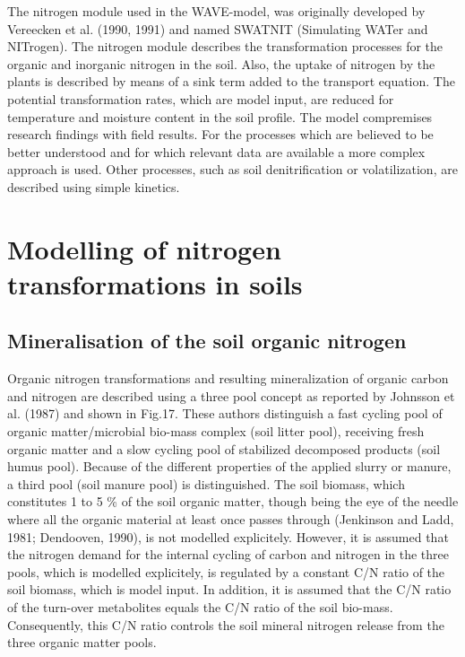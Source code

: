The nitrogen module used in the WAVE-model, was originally developed by Vereecken et al. (1990, 1991) and named SWATNIT (Simulating WATer and NITrogen). The nitrogen module describes the transformation processes for the organic and inorganic nitrogen in the soil. Also, the uptake of nitrogen by the plants is described by means of a sink term added to the transport equation. The potential transformation rates, which are model input, are reduced for temperature and moisture content in the soil profile. The model compremises research findings with field results. For the processes which are believed to be better understood and for which relevant data are available a more complex approach is used. Other processes, such as soil denitrification or volatilization, are described using simple kinetics.\\

\section{ Modelling of nitrogen transformations in soils}


\subsection {Mineralisation of the soil organic nitrogen}

Organic nitrogen transformations and resulting mineralization of organic carbon and nitrogen are described using a three pool concept as reported by Johnsson et al. (1987) and shown in Fig.17. These authors distinguish a fast cycling pool of organic matter/microbial bio-mass complex (soil litter pool), receiving fresh organic matter and a slow cycling pool of stabilized decomposed products (soil humus pool). Because of the different properties of the applied slurry or manure, a third pool (soil manure pool) is distinguished. The soil biomass, which constitutes 1 to 5 \% of the soil organic matter, though being the eye of the needle where all the organic material at least once passes through (Jenkinson and Ladd, 1981; Dendooven, 1990), is not modelled explicitely. However, it is assumed that the nitrogen demand for the internal cycling of carbon and nitrogen in the three pools, which is modelled explicitely, is regulated by a constant C/N ratio of the soil biomass, which is model input. In addition, it is assumed that the C/N ratio of the turn-over metabolites equals the C/N ratio of the soil bio-mass. Consequently, this C/N ratio controls the soil mineral nitrogen release from the three organic matter pools.\\

